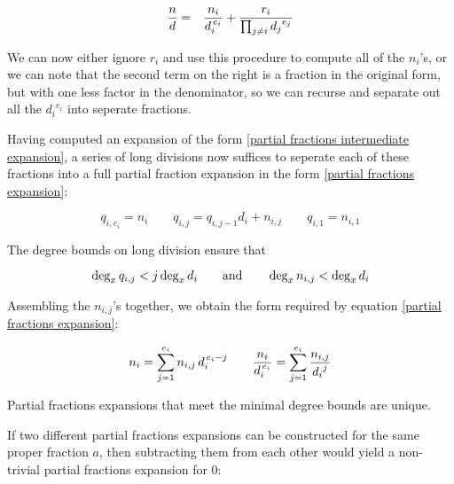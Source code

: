 \begin{eqnarray*}
{n\over d} &=& {{n_i}\over{d_i^{\,e_i}}} + {r_i\over{\prod_{j\ne i} {d_j}^{e_j}}} \cr
\end{eqnarray*}

We can now either ignore $r_i$ and use this procedure to compute
all of the $n_i$'s, or we can note that
the second term on the right is a fraction in the original form,
but with one less factor in the denominator, so we can recurse
and separate out all the ${d_i}^{e_i}$ into seperate fractions.

Having computed an expansion of the form \eqref{partial fractions
intermediate expansion}, a series of long divisions now suffices to
seperate each of these fractions into a full partial fraction expansion in the
form \eqref{partial fractions expansion}:


\begin{equation*}
q_{i,e_i} = n_i \qquad
q_{i,j} = q_{i,j-1} d_i + n_{i,j} \qquad
q_{i,1} = n_{i,1}
\end{equation*}

The degree bounds on long division ensure that

\begin{equation*}
\deg_x q_{i,j} < j \deg_x d_i  \qquad  {\rm and} \qquad \deg_x n_{i,j} < \deg_x d_i
\end{equation*}

Assembling the $n_{i,j}$'s together, we obtain the form
required by equation \eqref{partial fractions expansion}:


\begin{equation*}
n_i = \sum_{j=1}^{e_i} n_{i,j}\, d_i^{\,e_i-j} \qquad
{{n_i}\over{d_i^{\,e_i}}} = \sum_{j=1}^{e_i} {n_{i,j}\over {d_i}^j}
\end{equation*}

\theorem
Partial fractions expansions that meet the minimal degree bounds are unique.

\proof

If two different partial fractions expansions can be constructed for
the same proper fraction $a$, then subtracting them from each other
would yield a non-trivial partial fractions expansion for $0$:

